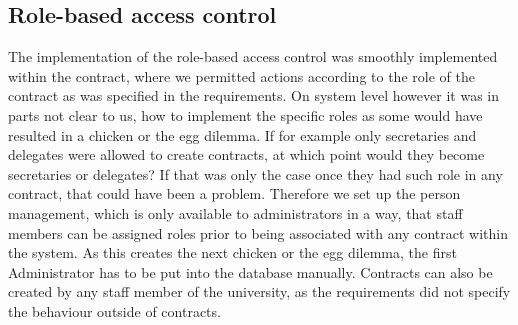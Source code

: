 \documentclass{article}
\begin{document}
\subsection{Role-based access control}
The implementation of the role-based access control was smoothly implemented within the contract, where we permitted actions according to the role of the contract as was specified in the requirements. On system level however it was in parts not clear to us, how to implement the specific roles as some would have resulted in a chicken or the egg dilemma. If for example only secretaries and delegates were allowed to create contracts, at which point would they become secretaries or delegates? If that was only the case once they had such role in any contract, that could have been a problem. Therefore we set up the person management, which is only available to administrators in a way, that staff members can be assigned roles prior to being associated with any contract within the system. As this creates the next chicken or the egg dilemma, the first Administrator has to be put into the database manually. Contracts can also be created by any staff member of the university, as the requirements did not specify the behaviour outside of contracts.
\newpage
\end{document}

